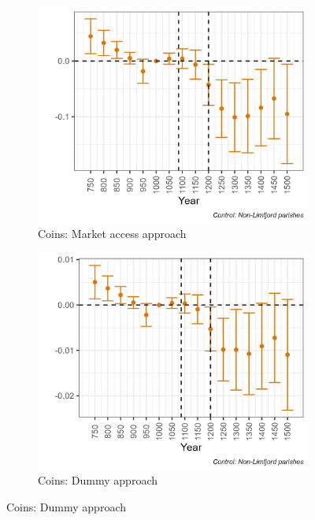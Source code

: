 \begin{figure}
    \centering
    \caption{Archaelogical results (matched sample)}
    \begin{subfigure}[b]{0.45\textwidth}
        \centering
        \caption{Coins: Market access approach} \label{fig:arch1a_match_norm}
        \includegraphics[width=\textwidth]{Plots/Regression_plots/arch_MA_coins_matched_norm.png}
    \end{subfigure}
    \hfill
    \begin{subfigure}[b]{0.45\textwidth}
        \centering
        \caption{Coins: Dummy approach} \label{fig:arch1b_match_norm}
        \includegraphics[width=\textwidth]{Plots/Regression_plots/arch_dummy_coins_matched_norm.png}

\end{subfigure}
\end{figure}
